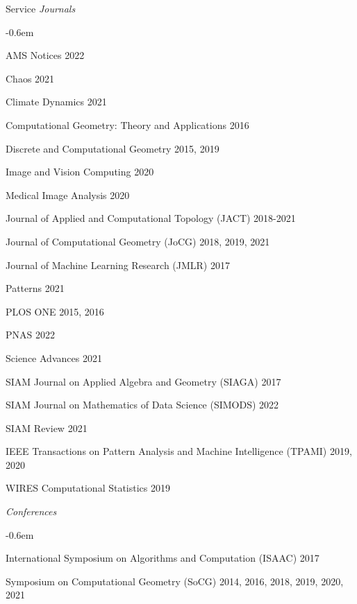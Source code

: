\documentclass{resume} %
\begin{document}
\begin{rSection}{Service}
\textit{Journals}
\begin{list}{}{\leftmargin=1em}
   \itemsep -0.6em \vspace{-0.5em} %
   \item AMS Notices \hfill 2022
   \item Chaos \hfill 2021
   \item Climate Dynamics \hfill 2021
   \item Computational Geometry: Theory and Applications \hfill 2016
   \item Discrete and Computational Geometry \hfill 2015, 2019
   \item Image and Vision Computing \hfill 2020
   \item Medical Image Analysis \hfill 2020
   \item Journal of Applied and Computational Topology (JACT) \hfill
   2018-2021
   \item Journal of Computational Geometry (JoCG) \hfill 2018, 2019, 2021
   \item Journal of Machine Learning Research (JMLR) \hfill 2017
   \item Patterns \hfill 2021
   \item PLOS ONE \hfill 2015, 2016
   \item PNAS \hfill 2022
   \item Science Advances \hfill 2021
   \item SIAM Journal on Applied Algebra and Geometry (SIAGA) \hfill 2017
   \item SIAM Journal on Mathematics of Data Science (SIMODS) \hfill 2022
   \item SIAM Review \hfill 2021
   \item IEEE Transactions on Pattern Analysis and Machine Intelligence (TPAMI) \hfill 2019, 2020
   \item WIRES Computational Statistics \hfill 2019
\end{list}
\textit{Conferences}
\begin{list}{}{\leftmargin=1em}
   \itemsep -0.6em \vspace{-0.5em} %
   \item International Symposium on Algorithms and Computation (ISAAC) \hfill 2017
   \item Symposium on Computational Geometry (SoCG) \hfill 2014, 2016, 2018, 2019, 2020, 2021

\end{list}
\end{rSection}
\end{document}
